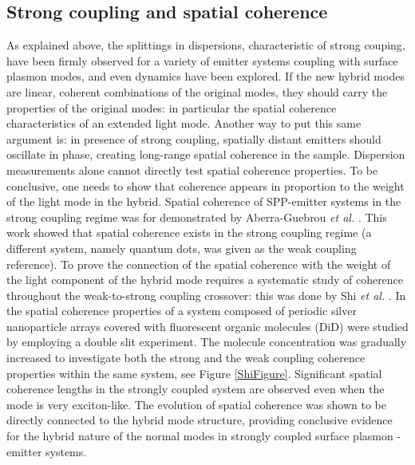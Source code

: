 \documentclass[12pt]{iopart}
\begin{document}
\subsection{Strong coupling and spatial coherence}

As explained above, the splittings in dispersions, characteristic of strong couping, have been firmly observed for a variety of emitter systems coupling with surface plasmon modes, and even dynamics have been explored. If the new hybrid modes are linear, coherent combinations of the original modes, they should carry the properties of the original modes: in particular the spatial coherence characteristics of an extended light mode. Another way to put this same argument is: in presence of strong coupling, spatially distant emitters should oscillate in phase, creating long-range spatial coherence in the sample. Dispersion measurements alone cannot directly test spatial coherence properties. To be conclusive, one needs to show that coherence appears in proportion to the weight of the light mode in the hybrid. Spatial coherence of SPP-emitter systems in the strong coupling regime was for demonstrated by Aberra-Guebrou {\it et al.} \cite{AberraGuebrou2012}. This work showed that spatial coherence exists in the strong coupling regime (a different system, namely quantum dots, was given as the weak coupling reference). To prove the connection of the spatial coherence with the weight of the light component of the hybrid mode requires a systematic study of coherence throughout the weak-to-strong coupling crossover: this was done by Shi {\it et al.} \cite{Shi2014}.  In \cite{Shi2014} the spatial coherence properties of a system composed of periodic silver nanoparticle arrays covered with fluorescent organic molecules (DiD) were studied by employing a double slit experiment. The molecule concentration was gradually increased to investigate both the strong and the weak coupling coherence properties within the same system, see Figure \ref{ShiFigure}. Significant spatial coherence lengths in the strongly coupled system are observed even when the mode is very exciton-like. The evolution of spatial coherence was shown to be directly connected to the hybrid mode structure, providing conclusive evidence for the hybrid nature of the normal modes in strongly coupled surface plasmon - emitter systems. 
\end{document}
